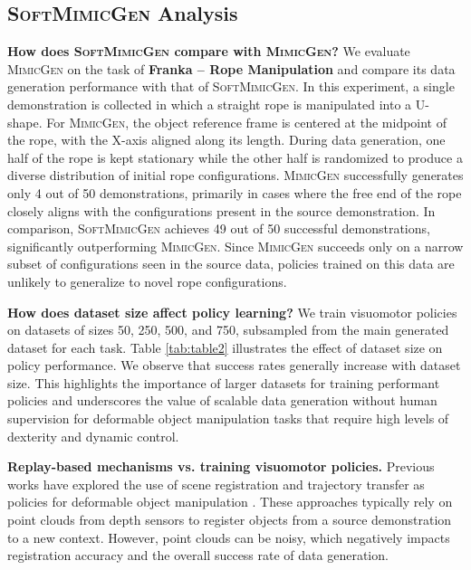 \documentclass[letterpaper, 10 pt, conference]{ieeeconf}  %
\newcommand{\sysName}{\textsc{SoftMimicGen}\xspace}
\newcommand{\MimicGen}{\textsc{MimicGen}\xspace}
\begin{document}
\subsection{\sysName Analysis}
\label{subsec:analysis}


\textbf{How does \sysName compare with \MimicGen?} We evaluate \MimicGen on the task of \textbf{Franka -- Rope Manipulation} and compare its data generation performance with that of \sysName. In this experiment, a single demonstration is collected in which a straight rope is manipulated into a U-shape. For \MimicGen, the object reference frame is centered at the midpoint of the rope, with the X-axis aligned along its length. During data generation, one half of the rope is kept stationary while the other half is randomized to produce a diverse distribution of initial rope configurations. \MimicGen successfully generates only 4 out of 50 demonstrations, primarily in cases where the free end of the rope closely aligns with the configurations present in the source demonstration. In comparison, \sysName achieves 49 out of 50 successful demonstrations, significantly outperforming \MimicGen. Since \MimicGen succeeds only on a narrow subset of configurations seen in the source data, policies trained on this data are unlikely to generalize to novel rope configurations.


\textbf{How does dataset size affect policy learning?} We train visuomotor policies on datasets of sizes 50, 250, 500, and 750, subsampled from the main generated dataset for each task. Table \ref{tab:table2} illustrates the effect of dataset size on policy performance. We observe that success rates generally increase with dataset size. This highlights the importance of larger datasets for training performant policies and underscores the value of scalable data generation without human supervision for deformable object manipulation tasks that require high levels of dexterity and dynamic control.





\textbf{Replay-based mechanisms vs. training visuomotor policies.} Previous works have explored the use of scene registration and trajectory transfer as policies for deformable object manipulation \cite{schulman2016learning, schulman2013case}. These approaches typically rely on point clouds from depth sensors to register objects from a source demonstration to a new context. However, point clouds can be noisy, which negatively impacts registration accuracy and the overall success rate of data generation.
\end{document}
